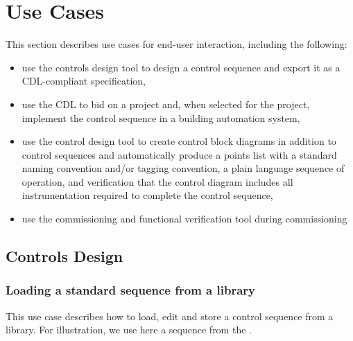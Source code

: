 \documentclass[letterpaper,10pt, openany,english]{sphinxmanual}
\begin{document}
\chapter{Use Cases}
\label{\detokenize{useCases:use-cases}}\label{\detokenize{useCases:sec-use-cases}}\label{\detokenize{useCases::doc}}
This section describes use cases for end-user interaction, including the following:
\begin{itemize}
\item {} 
use the controls design tool to design a control sequence and export
it as a CDL-compliant specification,

\item {} 
use the CDL to bid on a project and, when selected for the project,
implement the control sequence in a building automation system,

\item {} 
use the control design tool to create control block diagrams in addition to control sequences
and automatically produce a points list with a standard naming convention and/or tagging
convention, a plain language sequence of operation,
and verification that the control diagram includes
all instrumentation required to complete the control sequence,

\item {} 
use the commissioning and functional verification tool during commissioning

\end{itemize}


\section{Controls Design}
\label{\detokenize{useCases:controls-design}}

\subsection{Loading a standard sequence from a library}
\label{\detokenize{useCases:loading-a-standard-sequence-from-a-library}}
This use case describes how to load, edit and store a control
sequence from a library. For illustration, we use here
a sequence from the .
\end{document}
